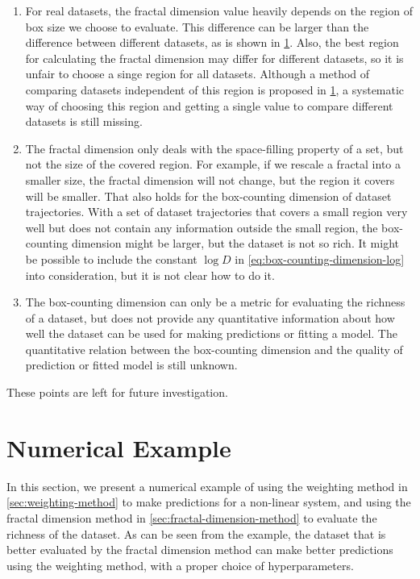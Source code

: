 \begin{enumerate}
    \item For real datasets, the fractal dimension value heavily depends on the region of box size we choose to evaluate.
    This difference can be larger than the difference between different datasets, as is shown in \cref{sec:non-linear-system-numerical-example}.
    Also, the best region for calculating the fractal dimension may differ for different datasets, so it is unfair to choose a singe region for all datasets.
    Although a method of comparing datasets independent of this region is proposed in \cref{sec:non-linear-system-numerical-example}, a systematic way of choosing this region and getting a single value to compare different datasets is still missing.
    \item The fractal dimension only deals with the space-filling property of a set, but not the size of the covered region.
    For example, if we rescale a fractal into a smaller size, the fractal dimension will not change, but the region it covers will be smaller.
    That also holds for the box-counting dimension of dataset trajectories.
    With a set of dataset trajectories that covers a small region very well but does not contain any information outside the small region, the box-counting dimension might be larger, but the dataset is not so rich.
    It might be possible to include the constant $\log D$ in \cref{eq:box-counting-dimension-log} into consideration, but it is not clear how to do it.
    \item The box-counting dimension can only be a metric for evaluating the richness of a dataset, but does not provide any quantitative information about how well the dataset can be used for making predictions or fitting a model.
    The quantitative relation between the box-counting dimension and the quality of prediction or fitted model is still unknown.
\end{enumerate}

These points are left for future investigation.


\section{Numerical Example}\label{sec:non-linear-system-numerical-example}

In this section, we present a numerical example of using the weighting method in \cref{sec:weighting-method} to make predictions for a non-linear system, and using the fractal dimension method in \cref{sec:fractal-dimension-method} to evaluate the richness of the dataset.
As can be seen from the example, the dataset that is better evaluated by the fractal dimension method can make better predictions using the weighting method, with a proper choice of hyperparameters.

